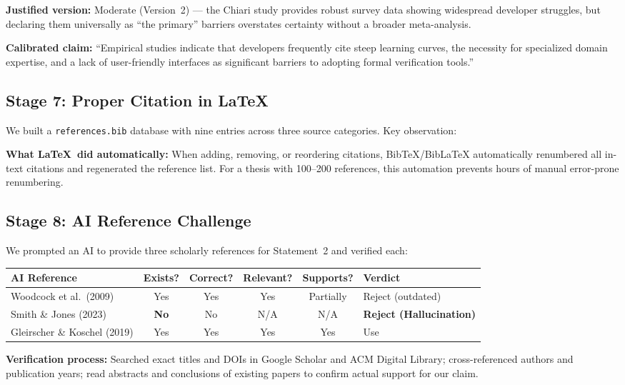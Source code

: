 \documentclass[11pt, a4paper]{article}
\begin{document}
\noindent\textbf{Justified version:} Moderate (Version~2) --- the Chiari study provides robust survey data showing widespread developer struggles, but declaring them universally as ``the primary'' barriers overstates certainty without a broader meta-analysis.

\noindent\textbf{Calibrated claim:} ``Empirical studies indicate that developers frequently cite steep learning curves, the necessity for specialized domain expertise, and a lack of user-friendly interfaces as significant barriers to adopting formal verification tools.''

\subsection{Stage 7: Proper Citation in \LaTeX}
We built a \texttt{references.bib} database with nine entries across three source categories. Key observation:

\textbf{What \LaTeX\ did automatically:} When adding, removing, or reordering citations, BibTeX/BibLaTeX automatically renumbered all in-text citations and regenerated the reference list. For a thesis with 100--200 references, this automation prevents hours of manual error-prone renumbering.

\subsection{Stage 8: AI Reference Challenge}
We prompted an AI to provide three scholarly references for Statement~2 and verified each:

\begin{tabular}{@{}p{4cm} c c c c p{2.5cm}@{}}
    \toprule
    \textbf{AI Reference} & \textbf{Exists?} & \textbf{Correct?} & \textbf{Relevant?} & \textbf{Supports?} & \textbf{Verdict} \\
    \midrule
    Woodcock et al.\ (2009) & Yes & Yes & Yes & Partially & Reject (outdated) \\
    Smith \& Jones (2023) & \textbf{No} & No & N/A & N/A & \textbf{Reject (Hallucination)} \\
    Gleirscher \& Koschel (2019) & Yes & Yes & Yes & Yes & Use \\
    \bottomrule
\end{tabular}

\noindent\textbf{Verification process:} Searched exact titles and DOIs in Google Scholar and ACM Digital Library; cross-referenced authors and publication years; read abstracts and conclusions of existing papers to confirm actual support for our claim.
\end{document}
